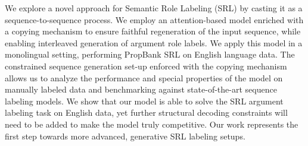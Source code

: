 We explore a novel approach for Semantic Role Labeling (SRL) by casting it as a sequence-to-sequence process. We employ an attention-based model enriched with a copying mechanism to ensure faithful regeneration of the input sequence, while enabling interleaved generation of argument role labels. We apply this model in a monolingual setting, performing PropBank SRL on English language data. The constrained sequence generation set-up enforced with the copying mechanism allows us to analyze the performance and special properties of the model on manually labeled data and benchmarking against state-of-the-art sequence labeling models. We show that our model is able to solve the SRL argument labeling task on English data, yet further structural decoding constraints will need to be added to make the model truly competitive. Our work represents the first step towards more advanced, generative SRL labeling setups.
